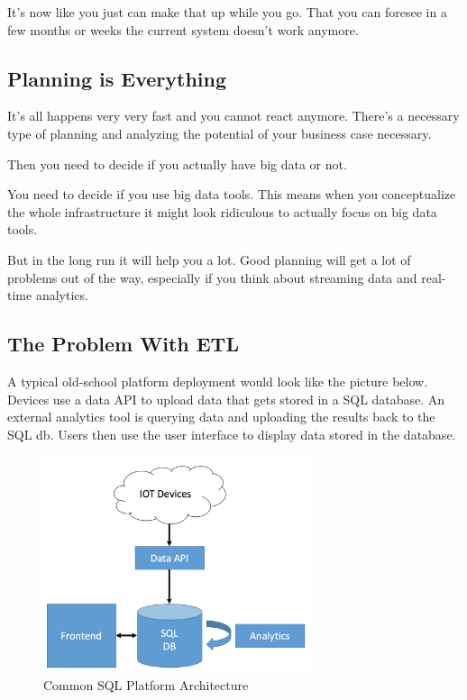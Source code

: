 \documentclass[12pt, numbers=noenddot]{scrreprt} %
\begin{document}
It’s now like you just can make that up while you go. That you can foresee in a few months or weeks the current system doesn’t work anymore.

\subsection{Planning is Everything}

It’s all happens very very fast and you cannot react anymore. There’s a necessary type of planning and analyzing the potential of your business case necessary.

Then you need to decide if you actually have big data or not.

You need to decide if you use big data tools. This means when you conceptualize the whole infrastructure it might look ridiculous to actually focus on big data tools.

But in the long run it will help you a lot. Good planning will get a lot of problems out of the way, especially if you think about streaming data and real-time analytics.

\subsection{The Problem With ETL}
A typical old-school platform deployment would look like the picture below. Devices use a data API to upload data that gets stored in a SQL database. An external analytics tool is querying data and uploading the results back to the SQL db. Users then use the user interface to display data stored in the database.

\begin{figure}[htbp]
  \centering
     \includegraphics[width=0.7\textwidth]{images/Common-SQL-Architecture}
  \caption{Common SQL Platform Architecture}
  \label{fig:Bild1}
\end{figure}
\end{document}
